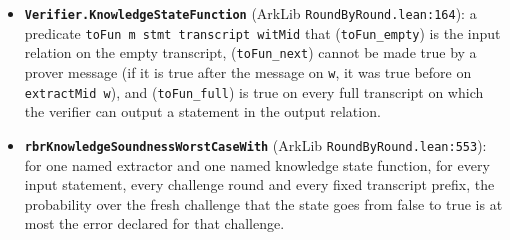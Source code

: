 \begin{itemize}
\item \textbf{\texttt{V\allowbreak{}e\allowbreak{}r\allowbreak{}i\allowbreak{}f\allowbreak{}i\allowbreak{}e\allowbreak{}r\allowbreak{}.\allowbreak{}K\allowbreak{}n\allowbreak{}o\allowbreak{}w\allowbreak{}l\allowbreak{}e\allowbreak{}d\allowbreak{}g\allowbreak{}e\allowbreak{}S\allowbreak{}t\allowbreak{}a\allowbreak{}t\allowbreak{}e\allowbreak{}F\allowbreak{}u\allowbreak{}n\allowbreak{}c\allowbreak{}t\allowbreak{}i\allowbreak{}o\allowbreak{}n}} (ArkLib \texttt{RoundByRound.\allowbreak{}lean:164}): a predicate \texttt{t\allowbreak{}o\allowbreak{}F\allowbreak{}u\allowbreak{}n\allowbreak{} m\allowbreak{} s\allowbreak{}t\allowbreak{}m\allowbreak{}t\allowbreak{} t\allowbreak{}r\allowbreak{}a\allowbreak{}n\allowbreak{}s\allowbreak{}c\allowbreak{}r\allowbreak{}i\allowbreak{}p\allowbreak{}t\allowbreak{} w\allowbreak{}i\allowbreak{}t\allowbreak{}M\allowbreak{}i\allowbreak{}d} that (\texttt{toFun\_\allowbreak{}empty}) is the input relation on the empty transcript, (\texttt{toFun\_\allowbreak{}next}) cannot be made true by a prover message (if it is true after the message on \texttt{w}, it was true before on \texttt{extractMid w}), and (\texttt{toFun\_\allowbreak{}full}) is true on every full transcript on which the verifier can output a statement in the output relation.
\item \textbf{\texttt{r\allowbreak{}b\allowbreak{}r\allowbreak{}K\allowbreak{}n\allowbreak{}o\allowbreak{}w\allowbreak{}l\allowbreak{}e\allowbreak{}d\allowbreak{}g\allowbreak{}e\allowbreak{}S\allowbreak{}o\allowbreak{}u\allowbreak{}n\allowbreak{}d\allowbreak{}n\allowbreak{}e\allowbreak{}s\allowbreak{}s\allowbreak{}W\allowbreak{}o\allowbreak{}r\allowbreak{}s\allowbreak{}t\allowbreak{}C\allowbreak{}a\allowbreak{}s\allowbreak{}e\allowbreak{}W\allowbreak{}i\allowbreak{}t\allowbreak{}h}} (ArkLib \texttt{RoundByRound.\allowbreak{}lean:553}): for one named extractor and one named knowledge state function, for every input statement, every challenge round and every fixed transcript prefix, the probability over the fresh challenge that the state goes from false to true is at most the error declared for that challenge.
\end{itemize}


